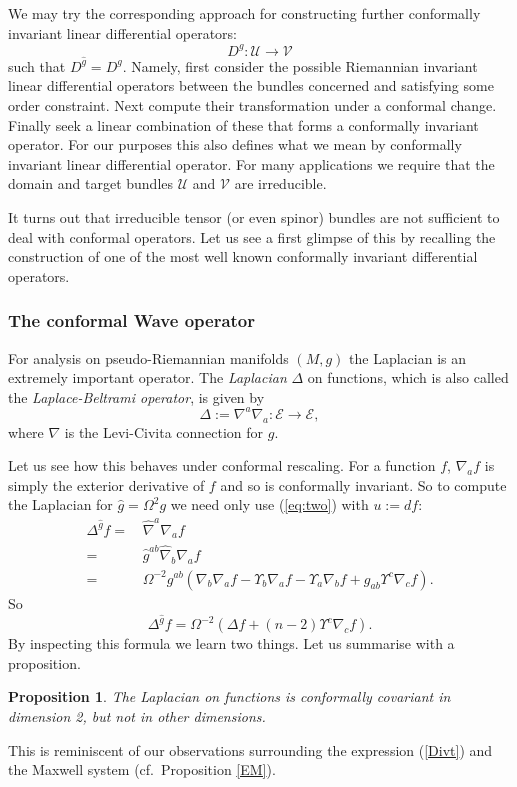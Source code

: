 \documentclass[a4paper,12pt]{amsart}
\def\Cal{\mathcal}
\newcommand{\ce}{{\Cal E}}
\def\cV{\mathcal{V}}
\def\cU{\mathcal{U}}
\newtheorem{proposition}[theorem]{Proposition}
\theoremstyle{remark}
\newcommand{\nn}[1]{(\ref{#1})}
\begin{document}
We may try the corresponding approach for constructing further conformally
invariant linear differential operators:
\begin{equation}\label{cildo}
D^g:\mathcal{U}\rightarrow\mathcal{V}
\end{equation}
such that $D^{\widehat{g}}=D^g$.  Namely, first consider the possible
Riemannian invariant linear differential operators between the bundles
concerned and satisfying some order constraint. Next compute their
transformation under a conformal change. Finally seek a linear
combination of these that forms a conformally invariant operator. For
our purposes this also defines what we mean by conformally invariant
linear differential operator. For many applications we require that
the domain and target bundles $\cU$ and $\cV$ are irreducible. 

It turns out that irreducible tensor (or even spinor) bundles are not
sufficient to deal with conformal operators. Let us see a first
glimpse of this by recalling the construction of one of the most well
known conformally invariant differential operators.

\subsubsection{The conformal Wave operator} \label{Y}

For analysis on pseudo-Riemannian manifolds $(M,g)$ the Laplacian is
an extremely important operator.  The {\em Laplacian} $\Delta$
on functions, which is also called the {\em Laplace-Beltrami operator}, 
is given by
$$
\Delta:= \nabla^a\nabla_a :\ce\to \ce,
$$ 
where $\nabla$ is the Levi-Civita connection for $g$. 

Let us see how this behaves under conformal rescaling. For a function $f$,
$\nabla_a f$ is simply the exterior derivative of $f$ and so is
conformally invariant. So to compute the Laplacian for
$\widehat{g}=\Omega^2 g$ we need only use \nn{eq:two} with $u:=df$:
\begin{equation}\nonumber
\begin{split}
 \Delta^{\widehat{g}}f=&\,\widehat{\nabla}^a\nabla_a f\\
=&\,\widehat{g}^{ab}\widehat{\nabla}_b\nabla_a f\\
=&\,\Omega^{-2}g^{ab}\left(\nabla_b\nabla_a f-\Upsilon_b\nabla_a f 
-\Upsilon_a\nabla_b f+g_{ab}\Upsilon^c\nabla_c f\right).
\end{split}
\end{equation}
So 
\begin{equation}\label{Bt}
\Delta^{\hat{g}} f = 
\Omega^{-2}\left(\Delta f +(n-2)\Upsilon^c\nabla_c f\right).
\end{equation}
By inspecting this formula we learn two things. Let us summarise with a
proposition.
\begin{proposition}\label{lap2}
The Laplacian on functions is conformally covariant in
dimension 2, but not in other dimensions.
\end{proposition}
\noindent This is reminiscent of our observations surrounding the
expression \nn{Divt} and the Maxwell system (cf.\ Proposition \ref{EM}). 
\end{document}

